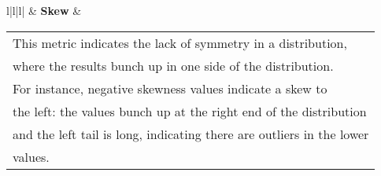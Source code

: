 \begin{table}[]
{\begin{tabular}{l|l|l|}
                              & \textbf{Skew}                                                          & \begin{tabular}[c]{@{}l@{}}This metric indicates the lack of symmetry in a distribution,\\ where the results bunch up in one side of the distribution.\\ For instance, negative skewness values indicate a skew to\\ the left: the values bunch up at the right end of the distribution\\ and the left tail is long, indicating there are outliers in the lower\\ values.\end{tabular}                                                                                                                                                                                                                                      \\ \hline
    \end{tabular}
    }
    \end{table}